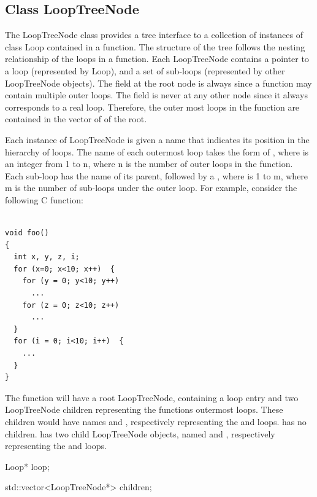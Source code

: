 \subsection{Class LoopTreeNode}
The LoopTreeNode class provides a tree interface to a collection of instances of class
Loop contained in a function. The structure of the tree
follows the nesting relationship of the loops in a function.
Each LoopTreeNode contains a pointer to a loop (represented by Loop), and a set
of sub-loops (represented by other LoopTreeNode objects). The  field
at the root node is always  since a function may contain multiple outer
loops. The  field is never  at any other node since it
always corresponds to a real loop.
Therefore, the outer most loops in the function are contained in the vector of  of the root.

Each instance of LoopTreeNode is given a name that indicates its position in the hierarchy of loops.
The name of each outermost loop takes the form of ,
where  is an integer from 1 to n,
where n is the number of outer loops in the function.
Each sub-loop has the name of its parent,
followed by a , where  is 1 to m, where m is the number of sub-loops under the outer loop.
For example, consider the following C function:


\begin{lstlisting}

void foo()
{
  int x, y, z, i;
  for (x=0; x<10; x++)  {
    for (y = 0; y<10; y++)
      ...
    for (z = 0; z<10; z++)
      ...
  }
  for (i = 0; i<10; i++)  {
    ...
  }
}
\end{lstlisting}

The  function will have a root LoopTreeNode, containing a  loop entry and
two LoopTreeNode children representing the functions outermost loops. These children
would have names  and , respectively representing the  and  loops.  has
no children.  has two child LoopTreeNode objects, named
 and
, respectively representing the  and  loops.

\begin{apient}
Loop* loop;
\end{apient}

\begin{apient}
std::vector<LoopTreeNode*> children;
\end{apient}

